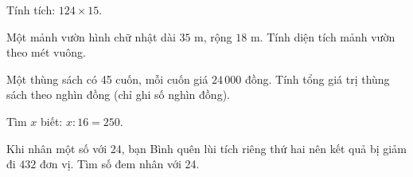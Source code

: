 \begin{ex} %
Tính tích: $124 \times 15$.
\end{ex}

\begin{ex} %
Một mảnh vườn hình chữ nhật dài $35\text{ m}$, rộng $18\text{ m}$. Tính diện tích mảnh vườn theo mét vuông.
\end{ex}

\begin{ex} %
Một thùng sách có 45 cuốn, mỗi cuốn giá $24\,000$ đồng. Tính tổng giá trị thùng sách theo nghìn đồng (chỉ ghi số nghìn đồng).
\end{ex}

\begin{ex} %
Tìm $x$ biết: $x : 16 = 250$.
\end{ex}

\begin{ex} %
Khi nhân một số với 24, bạn Bình quên lùi tích riêng thứ hai nên kết quả bị giảm đi $432$ đơn vị. Tìm số đem nhân với 24.
\end{ex}
